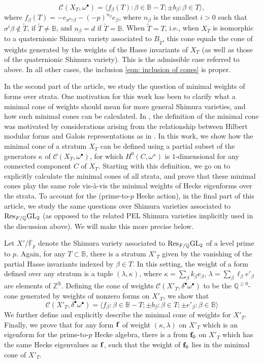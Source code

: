 \documentclass[11pt,pdflatex]{amsart}
\theoremstyle{plain}
\theoremstyle{definition}
\newcommand{\FF}{\mathbf{F}}
\newcommand{\QQ}{\mathbf{Q}}
\newcommand{\ZZ}{\mathbf{Z}}
\newcommand{\Fpbar}{{\overline{\FF}_p}}
\theoremstyle{plain}
\theoremstyle{definition}
\theoremstyle{remark}
\numberwithin{equation}{section}
\numberwithin{figure}{section} \numberwithin{table}{subsection}
\newcommand{\calC}{{\mathcal{C}}}
\def\BB{\mathbb{B}}
\def\FF{\mathbb{F}}
\def\QQ{\mathbb{Q}}
\def\ZZ{\mathbb{Z}}
\begin{document}
\[
\calC(X_T, \omega^\bullet)=\langle f_\beta(T): \beta \in \BB-T; \pm b_\beta: \beta \in T\rangle,
\]  
where $f_\beta(T)=-e_{\sigma^{n_\beta}\beta}-(-p)^{n_\beta}e_\beta$, where $n_\beta$ is the smallest $i>0$ such that $\sigma^i\beta \not\in \tilde{T}$, if $\tilde{T}\neq \BB$, and $n_\beta=d$ if $\tilde{T}=\BB$. When $\tilde{T}=T$, i.e., when $X_T$ is isomorphic to a quaternionic Shimura variety associated to $B_{\tilde{T}}$, this cone equals the cone of weights generated by the weights of the Hasse invariants of $X_T$ (as well as those of the quaternionic Shimura variety). This is the admissible case referred to above. In all other cases, the inclusion \ref{eqn: inclusion of cones} is proper.

In the second part of the article, we study the question of minimal weights of forms over strata. One motivation for this work has been to clarify what a minimal cone of weights should mean for more general Shimura varieties, and how such minimal cones can be calculated. In \cite{DK1}, the definition of the minimal cone was motivated by considerations arising from the relationship between Hilbert modular forms and Galois representations as in \cite{DS}. In this work, we show how the minimal cone of a stratum $X_T$ can be defined using a partial subset of the generators $\kappa$ of $\calC(X_T,\omega^\bullet)$, for which $ H^0(C,\omega^\kappa)$ is $1$-dimensional for any connected component $C$ of $X_T$.     Starting with this definition, we go on to explicitly calculate the minimal cones of all strata, and prove that  these  minimal cones play the same role vis-\`a-vis the minimal weights of Hecke eigenforms over the strata. To account for the (prime-to-$p$ Hecke action), in the final part of this article, we study the same questions over Shimura varieties associated to ${\rm Res}_{F/\QQ} {\rm GL}_2$ (as opposed to the related PEL Shimura varieties implicitly used in the discussion above). We will make this more precise below. 

Let $X'/\Fpbar$ denote the Shimura variety associated to ${\rm Res}_{F/\QQ} {\rm GL}_2$ of a level prime to $p$. Again, for any $T \subset \BB$, there is a stratum $X'_T$ given by the vanishing of the partial Hasse invariants indexed by $\beta \in T$.  In this setting, the weight of a form defined over any stratum is a tuple $(\lambda, \kappa)$, where $\kappa=\sum_\beta k_\beta e_\beta$, $\lambda=\sum_\beta \ell_\beta e'_\beta$ are elements of  $\ZZ^\BB$. Defining the cone of weights $\calC(X'_T,\delta^\bullet\omega^\bullet)$ to be the $\QQ^{\geq 0}$-cone generated by weights of nonzero forms on $X'_T$, we show that $$\calC(X'_T,\delta^\bullet\omega^\bullet)=\langle f_\beta: \beta \in \BB-T; \pm b_\beta: \beta \in T; \pm e'_\beta: \beta \in \BB\rangle$$
We further define and explicitly describe the minimal cone of weights for $X'_T$. Finally, we  prove that for any form ${\bf f}$ of weight $(\kappa,\lambda)$ on $X'_T$ which is an eigenform for the prime-to-$p$ Hecke algebra, there is a from ${\bf f}_0$ on $X'_T$ which has the same Hecke eigenvalues as ${\bf f}$, such that the weight of ${\bf f}_0$  lies in the minimal cone of $X'_T$.
\end{document}
